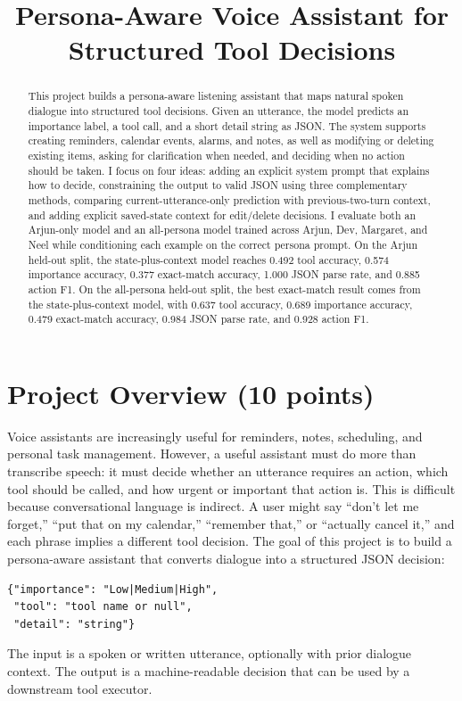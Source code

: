 \documentclass[11pt,a4paper]{article}
\begin{document}
\title{Persona-Aware Voice Assistant for Structured Tool Decisions}

\date{}
\maketitle

\begin{abstract}
This project builds a persona-aware listening assistant that maps natural spoken dialogue into structured tool decisions. Given an utterance, the model predicts an importance label, a tool call, and a short detail string as JSON. The system supports creating reminders, calendar events, alarms, and notes, as well as modifying or deleting existing items, asking for clarification when needed, and deciding when no action should be taken. I focus on four ideas: adding an explicit system prompt that explains how to decide, constraining the output to valid JSON using three complementary methods, comparing current-utterance-only prediction with previous-two-turn context, and adding explicit saved-state context for edit/delete decisions. I evaluate both an Arjun-only model and an all-persona model trained across Arjun, Dev, Margaret, and Neel while conditioning each example on the correct persona prompt. On the Arjun held-out split, the state-plus-context model reaches 0.492 tool accuracy, 0.574 importance accuracy, 0.377 exact-match accuracy, 1.000 JSON parse rate, and 0.885 action F1. On the all-persona held-out split, the best exact-match result comes from the state-plus-context model, with 0.637 tool accuracy, 0.689 importance accuracy, 0.479 exact-match accuracy, 0.984 JSON parse rate, and 0.928 action F1.
\end{abstract}

\section{Project Overview (10 points)}

Voice assistants are increasingly useful for reminders, notes, scheduling, and personal task management. However, a useful assistant must do more than transcribe speech: it must decide whether an utterance requires an action, which tool should be called, and how urgent or important that action is. This is difficult because conversational language is indirect. A user might say ``don't let me forget,'' ``put that on my calendar,'' ``remember that,'' or ``actually cancel it,'' and each phrase implies a different tool decision. The goal of this project is to build a persona-aware assistant that converts dialogue into a structured JSON decision:
\begin{verbatim}
{"importance": "Low|Medium|High",
 "tool": "tool name or null",
 "detail": "string"}
\end{verbatim}
The input is a spoken or written utterance, optionally with prior dialogue context. The output is a machine-readable decision that can be used by a downstream tool executor.
\end{document}

